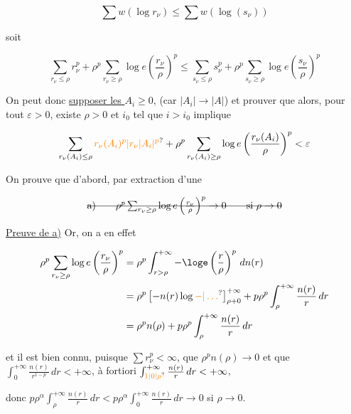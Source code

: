 
\[
\sum w(\log r_\nu)\leq\sum w(\log(s_\nu))
\]

soit

\[
\sum_{r_\nu\leq\rho}r_\nu^p+\rho^p\sum_{r_\nu\geq\rho}\log e\left(\frac{r_\nu}{\rho}\right)^p
\leq\sum_{s_\nu\leq\rho}s_\nu^p+\rho^p\sum_{s_\nu\geq\rho}\log e\left(\frac{s_\nu}{\rho}\right)^p
\]

On peut donc \uline{supposer les $A_i\geq0$}, (car $|A_i|\to|A|$) et prouver que alors, pour tout $\varepsilon>0$, existe $\rho>0$ et $i_0$ tel que $i>i_0$ implique

\[
\sum_{r_\nu(A_i)\leq\rho}\unsure{r_\nu(A_i)^p|r_\nu\lvert A_i\rvert^p}
+\rho^p\sum_{r_\nu(A_i)\geq\rho}\log e\left(\frac{r_\nu(A_i)}{\rho}\right)^p<\varepsilon
\]

On prouve que d'abord, par extraction d'une 


\[
\deleted{\text{a)}\qquad\rho^p\sum_{r_\nu\geq\rho}\log e\left(\frac{r_\nu}{\rho}\right)^p\to0\qquad\text{si }\rho\to0}
\]

 

\uline{Preuve de a)} Or, on a en effet

\[
\begin{aligned}
\rho^p\sum_{r_\nu\geq\rho}\log e\left(\frac{r_\nu}{\rho}\right)^p
&=\rho^p\int_{r>\rho}^{+\infty}-\loge\left(\frac{r}{\rho}\right)^p\,dn(r)\\
&=\rho^p\left[-n(r)\log\unsure{-|\ldots}\right]_{\rho+0}^{+\infty}
+p\rho^p\int_\rho^{+\infty}\frac{n(r)}{r}\,dr\\
&=\rho^p n(\rho)+p\rho^p\int_\rho^{+\infty}\frac{n(r)}{r}\,dr
\end{aligned}
\]

et il est bien connu, puisque $\sum r_\nu^p<\infty$, que $\rho^p n(\rho)\to0$
et que $\int_0^{+\infty}\frac{n(r)}{r^{1-p}}\,dr<+\infty$, à fortiori $\int_{\unsure{1|0|\rho}}^{+\infty}\frac{n(r)}r\,dr<+\infty$,

donc $p\rho^\alpha\int_\rho^{+\infty}\frac{n(r)}r\,dr<p\rho^\alpha\int_0^{+\infty}\frac{n(r)}r\,dr\to0$ si $\rho\to0$.

